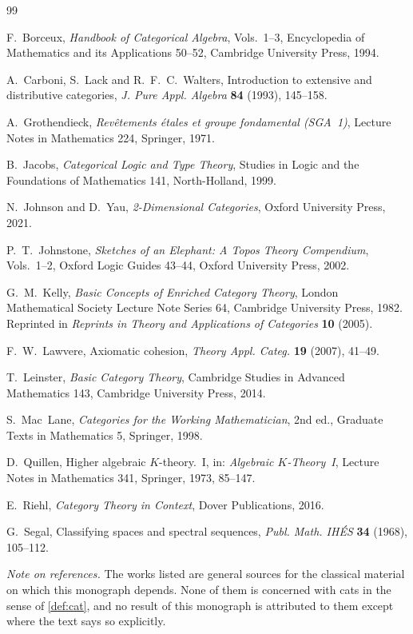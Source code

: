 \begin{thebibliography}{99}

F.~Borceux, \emph{Handbook of Categorical Algebra}, Vols.~1--3, Encyclopedia of
Mathematics and its Applications 50--52, Cambridge University Press, 1994.

A.~Carboni, S.~Lack and R.~F.~C.~Walters, Introduction to extensive and
distributive categories, \emph{J. Pure Appl. Algebra} \textbf{84} (1993),
145--158.

A.~Grothendieck, \emph{Rev\^etements \'etales et groupe fondamental (SGA~1)},
Lecture Notes in Mathematics 224, Springer, 1971.

B.~Jacobs, \emph{Categorical Logic and Type Theory}, Studies in Logic and the
Foundations of Mathematics 141, North-Holland, 1999.

N.~Johnson and D.~Yau, \emph{2-Dimensional Categories}, Oxford University
Press, 2021.

P.~T.~Johnstone, \emph{Sketches of an Elephant: A Topos Theory Compendium},
Vols.~1--2, Oxford Logic Guides 43--44, Oxford University Press, 2002.

G.~M.~Kelly, \emph{Basic Concepts of Enriched Category Theory}, London
Mathematical Society Lecture Note Series 64, Cambridge University Press, 1982.
Reprinted in \emph{Reprints in Theory and Applications of Categories}
\textbf{10} (2005).

F.~W.~Lawvere, Axiomatic cohesion, \emph{Theory Appl. Categ.} \textbf{19}
(2007), 41--49.

T.~Leinster, \emph{Basic Category Theory}, Cambridge Studies in Advanced
Mathematics 143, Cambridge University Press, 2014.

S.~Mac~Lane, \emph{Categories for the Working Mathematician}, 2nd ed.,
Graduate Texts in Mathematics 5, Springer, 1998.

D.~Quillen, Higher algebraic $K$-theory.~I, in: \emph{Algebraic $K$-Theory~I},
Lecture Notes in Mathematics 341, Springer, 1973, 85--147.

E.~Riehl, \emph{Category Theory in Context}, Dover Publications, 2016.

G.~Segal, Classifying spaces and spectral sequences, \emph{Publ. Math. IH\'ES}
\textbf{34} (1968), 105--112.

\end{thebibliography}

\noindent\emph{Note on references.} The works listed are general sources for the
classical material on which this monograph depends. None of them is concerned
with cats in the sense of \cref{def:cat}, and no result of this monograph is
attributed to them except where the text says so explicitly.
